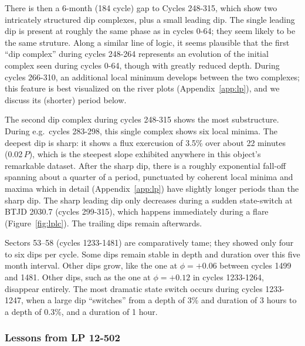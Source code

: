 \documentclass[11pt,twocolumn,tighten]{aastex63}
\begin{document}
There is then a 6-month (184 cycle) gap to Cycles 248-315, which show
two intricately structured dip complexes, plus a small leading dip.
The single leading dip is present at roughly the same phase as in
cycles 0-64; they seem likely to be the same struture.  Along a
similar line of logic, it seems plausible that the first ``dip
complex'' during cycles 248-264 represents an evolution of the initial
complex seen during cycles 0-64, though with greatly reduced depth.
During cycles 266-310, an additional local minimum develops between
the two complexes; this feature is best visualized on the river plots
(Appendix~\ref{app:lp}), and we discuss its (shorter) period below.

The second dip complex during cycles 248-315 shows the most
substructure.  During e.g.~cycles 283-298, this single complex shows
six local minima.  The deepest dip is sharp: it shows a flux
exercusion of 3.5\% over about 22 minutes (0.02\,$P$), which is the
steepest slope exhibited anywhere in this object's remarkable dataset.
After the sharp dip, there is a roughly exponential fall-off spanning
about a quarter of a period, punctuated by coherent local minima and
maxima which in detail (Appendix~\ref{app:lp}) have slightly longer
periods than the sharp dip.  The sharp leading dip only decreases
during a sudden state-switch at BTJD 2030.7 (cycles 299-315), which
happens immediately during a flare (Figure~\ref{fig:lplc}).  The
trailing dips remain afterwards.

Sectors 53--58 (cycles 1233-1481) are comparatively tame; they showed
only four to six dips per cycle.  Some dips remain stable in depth and
duration over this five month interval.  Other dips grow, like the one
at $\phi = +0.06$ between cycles 1499 and 1481.  Other dips, such as
the one at $\phi = +0.12$ in cycles 1233-1264, disappear entirely.
The most dramatic state switch occurs during cycles 1233-1247, when a
large dip ``switches'' from a depth of 3\% and duration of 3 hours to
a depth of 0.3\%, and a duration of 1 hour.


\subsubsection{Lessons from LP 12-502}
\end{document}
